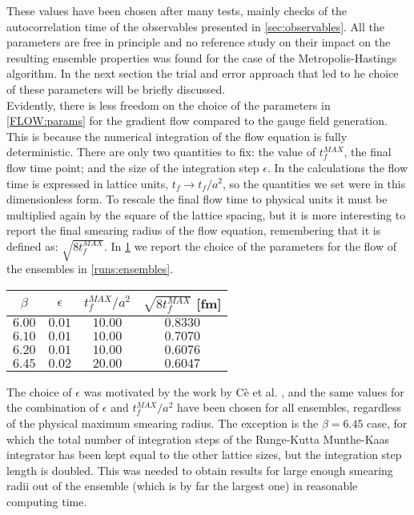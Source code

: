 These values have been chosen after many tests, mainly checks of the autocorrelation time of the observables presented in \cref{sec:observables}. All the parameters are free in principle and no reference study on their impact on the resulting ensemble properties was found for the case of the Metropolis-Hastings algorithm. In the next section the trial and error approach that led to he choice of these parameters will be briefly discussed.\\
Evidently, there is less freedom on the choice of the parameters in \cref{FLOW:params} for the gradient flow compared to the gauge field generation. This is because the numerical integration of the flow equation is fully deterministic. There are only two quantities to fix: the value of $t_f^{MAX}$, the final flow time point; and the size of the integration step $\epsilon$. In the calculations the flow time is expressed in lattice units, $t_f \rightarrow t_f/a^2$, so the quantities we set were in this dimensionless form. To rescale the final flow time to physical units it must be multiplied again by the square of the lattice spacing, but it is more interesting to report the final smearing radius of the flow equation, remembering that it is defined as: $\sqrt{8t_f^{MAX}}$. In \cref{runs:flow} we report the choice of the parameters for the flow of the ensembles in \cref{runs:ensembles}.
 
\begin{table}[!htb]
    \begin{center}
    \begin{tabular}{cccc} 
        $\beta$ & $\epsilon$ & $t_f^{MAX}/a^2$ & $\sqrt{8t_f^{MAX}}$ [fm] \\\hline
        $6.00$ & $0.01$ & $10.00$ & $0.8330$ \\
        $6.10$ & $0.01$ & $10.00$ & $0.7070$ \\
        $6.20$ & $0.01$ & $10.00$ & $0.6076$ \\
        $6.45$ & $0.02$ & $20.00$ & $0.6047$ 
    \end{tabular}
    \label{runs:flow} 
    \end{center} 
\end{table}
The choice of $\epsilon$ was motivated by the work by C\`{e} et al. \cite{ce_testing_2015}, and the same values for the combination of $\epsilon$ and $t_f^{MAX}/a^2$ have been chosen for all ensembles, regardless of the physical maximum smearing radius. The exception is the $\beta=6.45$ case, for which the total number of integration steps of the Runge-Kutta Munthe-Kaas integrator has been kept equal to the other lattice sizes, but the integration step length is doubled. This was needed to obtain results for large enough smearing radii out of the ensemble (which is by far the largest one) in reasonable computing time.


